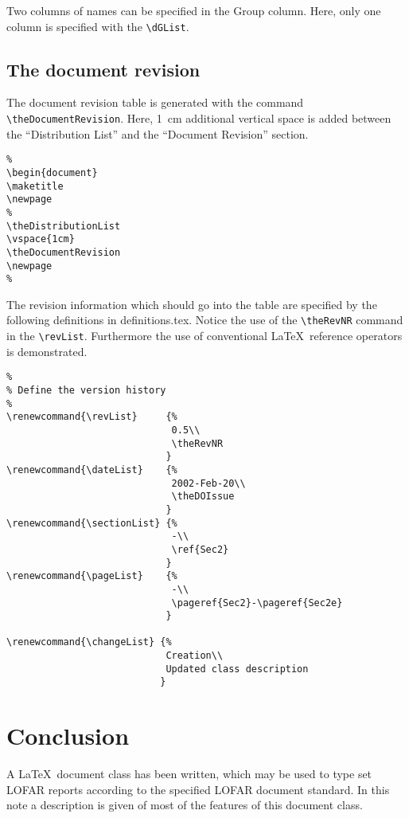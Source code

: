 \documentclass[]{lofar}
\begin{document}
%
Two columns of names can be specified in the Group column. Here, only
one column is specified with the \verb=\dGList=.

\subsection{The document revision}

The document revision table is generated with the command 
\verb=\theDocumentRevision=. Here, 1~cm additional vertical space 
is added between the ``Distribution List'' and the ``Document
Revision'' section.
%
\begin{verbatim}
%
\begin{document}
\maketitle
\newpage
%
\theDistributionList
\vspace{1cm}
\theDocumentRevision
\newpage
%
\end{verbatim}
%
The revision information which should go into the table are specified
by the following definitions in \textsf{definitions.tex}. Notice the
use of the \verb=\theRevNR= command in the
\verb=\revList=. Furthermore the use of conventional \LaTeX\ reference
operators is demonstrated.
%
\begin{verbatim}
%
% Define the version history
%
\renewcommand{\revList}     {%
                             0.5\\
                             \theRevNR
                            }
\renewcommand{\dateList}    {%
                             2002-Feb-20\\
                             \theDOIssue
                            }
\renewcommand{\sectionList} {%
                             -\\
                             \ref{Sec2}
                            }
\renewcommand{\pageList}    {%
                             -\\
                             \pageref{Sec2}-\pageref{Sec2e}
                            }

\renewcommand{\changeList} {%
                            Creation\\
                            Updated class description
                           }
\end{verbatim}

\label{Sec2e}

%

\section{Conclusion}
\label{Sec4}
A \LaTeX\ document class has been written, which may be used to type
set LOFAR reports according to the specified LOFAR document standard.
In this note a description is given of most of the features of this
document class.
\end{document}
